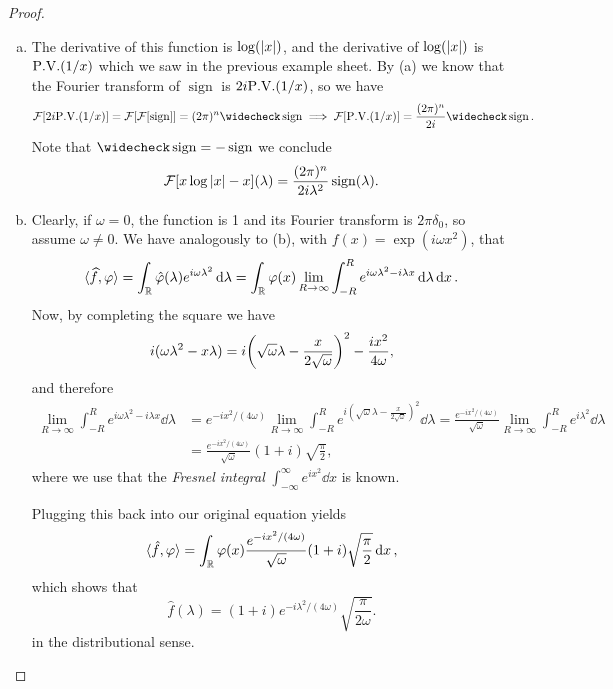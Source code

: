 \documentclass{article}
\theoremstyle{plain}
\theoremstyle{remark}
\renewcommand{\phi}{\varphi}
\newcommand{\Bb}{\mathbb}
\newcommand{\Cal}{\mathcal}
\newcommand{\RR}{\Bb R}
\newcommand\FF{\Cal F}
\DeclarePairedDelimiter{\ang}{\langle}{\rangle}
\newcommand\refl\widecheck
\DeclareMathOperator{\sign}{sign}
\begin{document}
\begin{proof}
\begin{enumerate}[(a)]
	\item The derivative of this function is $\log(\abs{x})$, and the derivative of $\log(\abs{x})$ is $\PV(1/x)$ which we saw in the previous example sheet. By (a) we know that the Fourier transform of $\sign$ is $2i \PV(1/x)$, so we have
	\[
	\FF[2i \PV(1/x)] = \FF[\FF[\sign]] = (2\pi)^n \refl\sign \implies \FF[\PV(1/x)] = \frac{(2\pi)^n}{2i} \refl\sign.
	\]
	Note that $\refl\sign = -\sign$ we conclude
	\[
	\FF[x\log\abs{x}- x](\lambda) = \frac{(2\pi)^n}{2i\lambda^2} \sign(\lambda). 
	\]
	
	\item  Clearly, if $\omega = 0$, the function is 1 and its Fourier transform is $2\pi\delta_0$, so assume $\omega \neq 0$. 
	We have analogously to (b), with $f(x) = \exp(i\omega x^2)$, that 
	\[
	\ang{\widehat{f}, \phi} = \int_\RR \hat\phi(\lambda) e^{i\omega \lambda^2} \dd{\lambda} = \int_\RR \phi(x) \lim_{R\to\infty} \int_{-R}^R e^{i\omega\lambda^2 - i\lambda x} \dd{\lambda} \dd{x}.
	\]
	Now, by completing the square we have
	\[
	i(\omega\lambda^2 - x\lambda) = i\qty(\sqrt\omega\lambda - \frac{x}{2\sqrt\omega})^2 - \frac{ix^2}{4\omega},
	\]
	and therefore
	\begin{align*}
	\lim_{R\to\infty} \int_{-R}^R e^{i\omega\lambda^2 - i\lambda x} \dd{\lambda} &= e^{-ix^2/(4\omega)} \lim_{R\to\infty} \int_{-R}^R e^{i(\sqrt\omega\lambda - \frac{x}{2\sqrt\omega})^2}\dd{\lambda} = \frac{e^{-ix^2/(4\omega)}}{\sqrt\omega} \lim_{R\to\infty} \int_{-R}^R e^{i\lambda^2} \dd{\lambda} \\
	&= \frac{e^{-ix^2/(4\omega)}}{\sqrt\omega} (1+i)\sqrt{\frac\pi2}, 
	\end{align*}
	where we use that the \emph{Fresnel integral} $\int_{-\infty}^\infty e^{ix^2} \dd{x}$ is known. 
	
	Plugging this back into our original equation yields
	\[
	\ang{\hat f, \phi} = \int_\RR \phi(x) \frac{e^{-ix^2/(4\omega)}}{\sqrt\omega} (1+i)\sqrt{\frac\pi2} \dd{x}, 
	\]
	which shows that
	\[
	\hat f(\lambda) =  (1+i) e^{-i\lambda^2/(4\omega)} \sqrt{\frac{\pi}{2\omega}}. 
	\]
	in the distributional sense. 
	\end{enumerate}
\end{proof}
\end{document}

